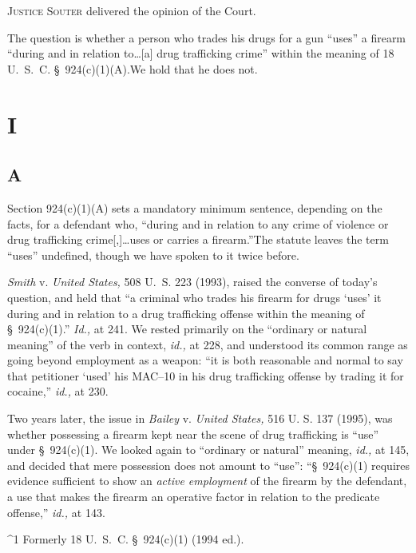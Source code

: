 
\setcounter{page}{76}

  \textsc{Justice Souter} delivered the opinion of the Court.

  The question is whether a person who trades his drugs for a gun
``uses'' a firearm ``during and in relation to\dots [a]
drug trafficking crime'' within the meaning of 18 U.~S.~C.
\S~924(c)(1)(A).\footnotemark[1] We hold that he does not.

\section{I}

\subsection{A}

  Section 924(c)(1)(A) sets a mandatory minimum sentence, depending
on the facts, for a defendant who, ``during and in relation to any
crime of violence or drug trafficking crime[,]\dots uses or carries
a firearm.''\footnotemark[2] The statute leaves the term ``uses'' undefined,
though we have spoken to it twice before.

  \emph{Smith} v. \emph{United States,} 508 U.~S. 223 (1993), raised the
converse of today's question, and held that ``a criminal who trades
his firearm for drugs ‘uses' it during and in relation to a drug
trafficking offense within the meaning of \S~924(c)(1).'' \emph{Id.,}
at 241. We rested primarily on the ``ordinary or natural meaning''
of the verb in context, \emph{id.,} at 228, and understood its common
range as going beyond employment as a weapon: ``it is both reasonable
and normal to say that petitioner ‘used' his MAC--10 in his drug
trafficking offense by trading it for cocaine,'' \emph{id.,} at 230.

  Two years later, the issue in \emph{Bailey} v. \emph{United States,} 516
U. S. 137 (1995), was whether possessing a firearm kept near the scene
of drug trafficking is ``use'' under \S~924(c)(1). We looked again to
``ordinary or natural'' meaning, \emph{id.,} at 145, and decided that
mere possession does not amount to ``use'': ``\S~924(c)(1) requires
evidence sufficient to show an \emph{active employment} of the firearm by
the defendant, a use that makes \newpage  the firearm an operative factor
in relation to the predicate offense,'' \emph{id.,} at 143.\footnotemark[3]

^1 Formerly 18 U.~S.~C. \S~924(c)(1) (1994 ed.).

